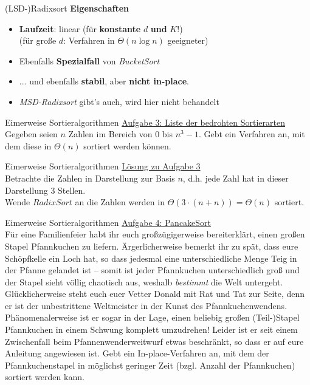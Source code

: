 \begin{frame}{(LSD-)Radixsort}
	\textbf{Eigenschaften}   
	\begin{itemize}
		\item \textbf{Laufzeit}: linear (für \textbf{konstante} $d$ \textbf{und} $K$!) \\
		\pause
		(für große $d$: Verfahren in $\Theta(n \log n)$ geeigneter)
		\pause
		\item Ebenfalls \textbf{Spezialfall} von \emph{BucketSort}
		\pause
		\item ... und ebenfalls \textbf{stabil}, aber \textbf{nicht in-place}.
		\pause
		\item \emph{MSD-Radixsort} gibt's auch, wird hier nicht behandelt
	\end{itemize}
\end{frame}

\begin{frame}{Eimerweise Sortieralgorithmen}
	\underline{Aufgabe 3: Liste der bedrohten Sortierarten} \\
	Gegeben seien $n$ Zahlen im Bereich von $0$ bis $n^3 - 1$. Gebt ein Verfahren an, mit dem diese in $\Theta(n)$ sortiert werden können.
\end{frame}

\begin{frame}{Eimerweise Sortieralgorithmen}
	\underline{Lösung zu Aufgabe 3} \\
	Betrachte die Zahlen in Darstellung zur Basis $n$, d.h. jede Zahl hat in dieser Darstellung 3 Stellen. \\ 
	Wende $RadixSort$ an \impl die Zahlen werden in $\Theta(3 \cdot (n + n)) = \Theta(n)$ sortiert.
\end{frame}

\begin{frame}{Eimerweise Sortieralgorithmen}
	\underline{Aufgabe 4: PancakeSort} \\
	Für eine Familienfeier habt ihr euch großzügigerweise bereiterklärt, einen großen Stapel Pfannkuchen zu liefern. Ärgerlicherweise bemerkt ihr zu spät, dass eure Schöpfkelle ein Loch hat, so dass jedesmal eine unterschiedliche Menge Teig in der Pfanne gelandet ist -- somit ist jeder Pfannkuchen unterschiedlich groß und der Stapel sieht völlig chaotisch aus, weshalb \emph{bestimmt} die Welt untergeht. Glücklicherweise steht euch euer Vetter Donald mit Rat und Tat zur Seite, denn er ist der unbestrittene Weltmeister in der Kunst des Pfannkuchenwendens. Phänomenalerweise ist er sogar in der Lage, einen beliebig großen (Teil-)Stapel Pfannkuchen in einem Schwung komplett umzudrehen! Leider ist er seit einem Zwischenfall beim Pfannenwenderweitwurf etwas beschränkt, so dass er auf eure Anleitung angewiesen ist. Gebt ein In-place-Verfahren an, mit dem der Pfannkuchenstapel in möglichst geringer Zeit (bzgl. Anzahl der Pfannkuchen) sortiert werden kann.
\end{frame}

